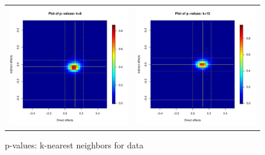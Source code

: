 \documentclass[12pt]{article}
\begin{document}
\begin{figure}
\begin{tabular}{cc}
	\includegraphics[scale=0.45]{./images/pval_plot_bergan_ideo_8nn_raw.pdf} &
	\includegraphics[scale=0.45]{./images/pval_plot_bergan_ideo_12nn_raw.pdf} \\ 
	\end{tabular}
	\caption{p-values: k-nearest neighbors for \citet{bergan2015call} data}
\end{figure}
\end{document}
